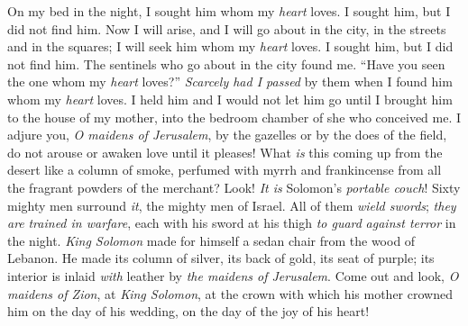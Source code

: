 \begin{biblechapter} %
 On my bed in the night, 
I sought him whom my \textit{heart} loves. 
I sought him, but I did not find him.
\verse Now I will arise, and I will go about in the city, 
in the streets and in the squares; 
I will seek him whom my \textit{heart} loves. 
I sought him, but I did not find him.
\verse The sentinels who go about in the city found me. 
“Have you seen the one whom my \textit{heart} loves?”
\verse \textit{Scarcely had I passed} by them 
when I found him whom my \textit{heart} loves. 
I held him and I would not let him go 
until I brought him to the house of my mother, 
into the bedroom chamber of she who conceived me.
 I adjure you, \textit{O maidens of Jerusalem}, 
by the gazelles or by the does of the field, 
do not arouse or awaken love until it pleases!
 What \textit{is} this coming up from the desert 
like a column of smoke, 
perfumed with myrrh and frankincense 
from all the fragrant powders of the merchant?
\verse Look! \textit{It is} Solomon’s \textit{portable couch}! 
Sixty mighty men surround \textit{it}, 
the mighty men of Israel.
\verse All of them \textit{wield swords}; 
\textit{they are} \textit{trained in warfare}, 
each with his sword at his thigh 
\textit{to guard} \textit{against terror} in the night.
\verse \textit{King Solomon} made for himself a sedan chair 
from the wood of Lebanon.
\verse He made its column of silver, its back of gold, its seat of purple; 
its interior is inlaid \textit{with} leather by \textit{the maidens of Jerusalem}.
\verse Come out and look, \textit{O maidens of Zion}, at \textit{King Solomon}, 
at the crown with which his mother crowned him 
on the day of his wedding, 
on the day of the joy of his heart!
\end{biblechapter}

